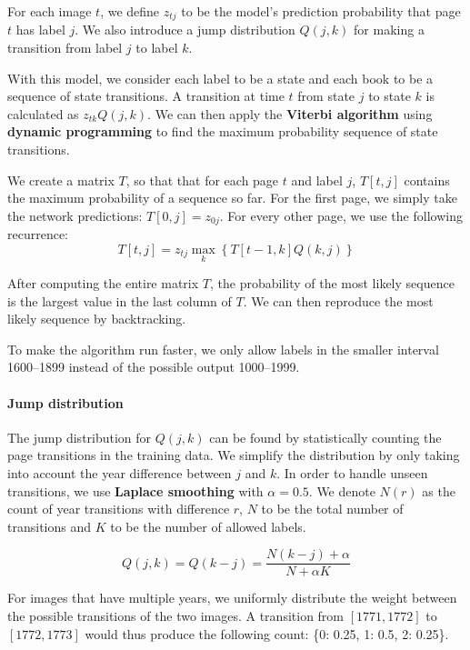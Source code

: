 For each image $t$, we define $z_{tj}$ to be the model's prediction probability that page $t$ has label $j$. We also introduce a jump distribution $Q(j, k)$ for making a transition from label $j$ to label $k$.

With this model, we consider each label to be a state and each book to be a sequence of state transitions. A transition at time $t$ from state $j$ to state $k$ is calculated as $z_{tk} Q(j, k)$. We can then apply the \textbf{Viterbi algorithm} using \textbf{dynamic programming} to find the maximum probability sequence of state transitions.

We create a matrix $T$, so that that for each page $t$ and label $j$, $T[t,j]$ contains the maximum probability of a sequence so far. For the first page, we simply take the network predictions: $T[0,j] = z_{0j}$. For every other page, we use the following recurrence:
\[
T[t,j] = z_{tj} \max_k \left\{ T[t-1,k] Q(k, j) \right\}
\]

After computing the entire matrix $T$, the probability of the most likely sequence is the largest value in the last column of $T$. We can then reproduce the most likely sequence by backtracking.

To make the algorithm run faster, we only allow labels in the smaller interval 1600--1899 instead of the possible output 1000--1999.

\paragraph{Jump distribution}
The jump distribution for $Q(j, k)$ can be found by statistically counting the page transitions in the training data. We simplify the distribution by only taking into account the year difference between $j$ and $k$. In order to handle unseen transitions, we use \textbf{Laplace smoothing} with $\alpha=0.5$. We denote $N(r)$ as the count of year transitions with difference $r$, $N$ to be the total number of transitions and $K$ to be the number of allowed labels.

\[
Q(j, k) = Q(k-j) = \frac{N(k-j) + \alpha}{N + \alpha K}
\]

For images that have multiple years, we uniformly distribute the weight between the possible transitions of the two images. A transition from $[1771, 1772]$ to $[1772, 1773]$ would thus produce the following count: \{0: 0.25, 1: 0.5, 2: 0.25\}.

